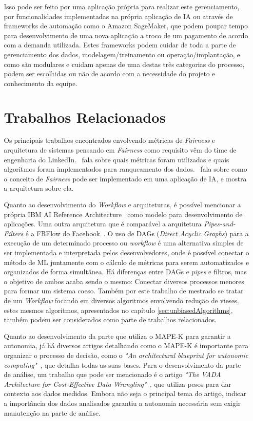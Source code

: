 \documentclass[portugues]{ic-tese}
\begin{document}
Isso pode ser feito por uma aplicação própria para realizar este gerenciamento, por funcionalidades implementadas na própria aplicação de IA ou através de frameworks de automação como o Amazon SageMaker, que podem poupar tempo para desenvolvimento de uma nova aplicação a troco de um pagamento de acordo com a demanda utilizada. Estes frameworks podem cuidar de toda a parte de gerenciamento dos dados, modelagem/treinamento ou operação/implantação, e como são modulares e cuidam apenas de uma destas três categorias do processo, podem ser escolhidas ou não de acordo com a necessidade do projeto e conhecimento da equipe.

\section{Trabalhos Relacionados}

Os principais trabalhos encontrados envolvendo métricas de \textit{Fairness} e arquitetura de sistemas pensando em \textit{Fairness} como requisito vêm do time de engenharia do LinkedIn.~\citet{Geyik_2019} fala sobre quais métricas foram utilizadas e quais algoritmos foram implementados para ranqueamento dos dados.~\citet{Kenthapadi_2019} fala sobre como o conceito de \textit{Fairness} pode ser implementado em uma aplicação de IA, e mostra a arquitetura sobre ela.

Quanto ao desenvolvimento do \textit{Workflow} e arquiteturas, é possível mencionar a própria IBM AI Reference Architecture~\citep{IBM_2021} como modelo para desenvolvimento de aplicações. Uma outra arquitetura que é comparável a arquitetura \textit{Pipes-and-Filters} é a FBFlow do Facebook~\citep{Dunn_2016}. O uso de DAGs (\textit{Direct Acyclic Graphs}) para a execução de um determinado processo ou \textit{workflow} é uma alternativa simples de ser implementada e interpretada pelos desenvolvedores, onde é possível conectar o método de ML juntamente com o cálculo de métricas para serem automatizados e organizados de forma simultânea. Há diferenças entre DAGs e \textit{pipes} e filtros, mas o objetivo de ambos acaba sendo o mesmo: Conectar diversos processos menores para formar um sistema coeso. Também por este trabalho de mestrado se tratar de um \textit{Workflow} focando em diversos algoritmos envolvendo redução de vieses, estes mesmos algoritmos, apresentados no capítulo \ref{sec:unbiasedAlgorithms}, também podem ser considerados como parte de trabalhos relacionados.

Quanto ao desenvolvimento da parte que utiliza o MAPE-K para garantir a autonomia, já há diversos artigos detalhando como o MAPE-K é importante para organizar o processo de decisão, como o \textit{"An architectural blueprint for autonomic computing"}~\citep{IBM_2005}, que detalha todas as suas bases. Para o desenvolvimento da parte de análise, um trabalho que pode ser mencionado é o artigo \textit{"The VADA Architecture for Cost-Effective Data Wrangling"}~\citep{Konstantinou_2017}, que utiliza pesos para dar contexto aos dados medidos. Embora não seja o principal tema do artigo, indicar a importância dos dados analisados garantiu a autonomia necessária sem exigir manutenção na parte de análise.
\end{document}
